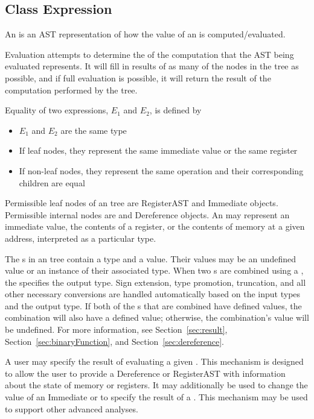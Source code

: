 \subsection{Class Expression}
\label{sec:expression}


An  is an AST representation of how the value of an  is
computed/evaluated.

Evaluation attempts to determine the  of the
computation that the AST being evaluated represents. It will fill in results of
as many of the nodes in the tree as possible, and if full evaluation is
possible, it will return the result of the computation performed by the tree.

Equality of two expressions, $E_1$ and $E_2$, is defined by
\begin{itemize}
\item $E_1$ and $E_2$ are the same type
\item If leaf nodes, they represent the same immediate value or the same register
\item If non-\/leaf nodes, they represent the same operation and their corresponding children are equal
\end{itemize}

Permissible leaf nodes of an  tree are RegisterAST and Immediate
objects. Permissible internal nodes are  and Dereference objects.
An  may represent an immediate value, the contents of a register, or
the contents of memory at a given address, interpreted as a particular type.

The s in an  tree contain a type and a value. Their values may
be an undefined value or an instance of their associated type. When two s
are combined using a , the  specifies the output
type. Sign extension, type promotion, truncation, and all other necessary
conversions are handled automatically based on the input types and the output
type. If both of the s that are combined have defined values, the
combination will also have a defined value; otherwise, the combination's value
will be undefined. For more information, see
Section~\ref{sec:result}, Section~\ref{sec:binaryFunction}, and
Section~\ref{sec:dereference}.

A user may specify the result of evaluating a given . This mechanism
is designed to allow the user to provide a Dereference or RegisterAST with
information about the state of memory or registers. It may additionally be used
to change the value of an Immediate or to specify the result of a
. This mechanism may be used to support other advanced analyses.

